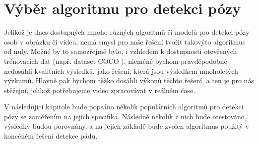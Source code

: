 \chapter{Výběr algoritmu pro detekci pózy}
\label{sec:Pose}

Jelikož je dnes dostupných mnoho různých algoritmů či modelů pro detekci pózy
osob v obrázku či videu, nemá smysl pro naše řešení tvořit takovýto algoritmus
od nuly. Možné by to samozřejmě bylo, i vzhledem k dostupnosti otevřených
trénovacích dat (např. dataset COCO \cite{coco}), nicméně bychom pravděpodobně
nedosáhli kvalitních výsledků, jako řešení, která jsou výsledkem mnoholetých
výzkumů. Hlavně pak bychom těžko dosáhli výkonů těchto řešení, a ten je pro nás
stěžejní, jelikož potřebujeme video zpracovávat v reálném čase.

V následující kapitole bude popsáno několik populárních algoritmů pro detekci
pózy se zaměřením na jejich specifika. Následně několik z nich bude otestováno,
výsledky budou porovnány, a na jejich základě bude zvolen algoritmus použitý v
konečném řešení detekce pádu.


\endinput